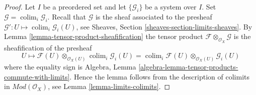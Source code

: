 \documentclass[10pt,a4paper]{amsart}
\theoremstyle{plain}
\theoremstyle{definition}
\theoremstyle{remark}
\numberwithin{equation}{subsection}
\def\colim{\mathop{\mathrm{colim}}\nolimits}
\begin{document}
\begin{proof}
Let $I$ be a preordered set and let $\{\mathcal{G}_i\}$ be
a system over $I$. Set $\mathcal{G} = \colim_i \mathcal{G}_i$.
Recall that $\mathcal{G}$ is the sheaf associated to the presheaf
$\mathcal{G}' : U \mapsto \colim_i \mathcal{G}_i(U)$, see
Sheaves, Section \ref{sheaves-section-limits-sheaves}.
By
Lemma \ref{lemma-tensor-product-sheafification}
the tensor product $\mathcal{F} \otimes_{\mathcal{O}_X} \mathcal{G}$
is the sheafification of the presheaf
$$
U \longmapsto
\mathcal{F}(U) \otimes_{\mathcal{O}_X(U)} \colim_i \mathcal{G}_i(U) =
\colim_i \mathcal{F}(U) \otimes_{\mathcal{O}_X(U)} \mathcal{G}_i(U)
$$
where the equality sign is
Algebra, Lemma \ref{algebra-lemma-tensor-products-commute-with-limits}.
Hence the lemma follows from the description of colimits in
$\textit{Mod}(\mathcal{O}_X)$, see Lemma \ref{lemma-limits-colimits}.
\end{proof}
\end{document}
